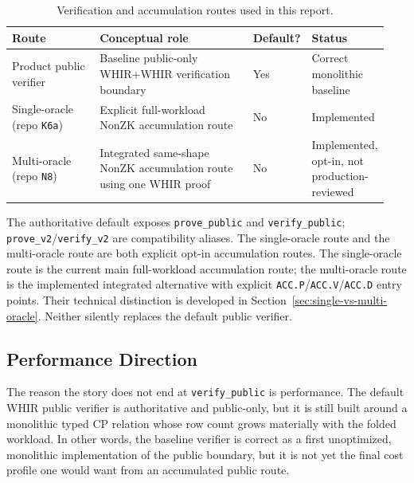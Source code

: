 \documentclass[11pt]{article}
\theoremstyle{definition}
\begin{document}
\begin{table}[H]
\centering
\small
\setlength{\tabcolsep}{3pt}
\renewcommand{\arraystretch}{1.15}
\begin{tabular}{>{\raggedright\arraybackslash}p{0.24\linewidth} >{\raggedright\arraybackslash}p{0.42\linewidth} >{\centering\arraybackslash}p{0.10\linewidth} >{\raggedright\arraybackslash}p{0.18\linewidth}}
\toprule
Route & Conceptual role & Default? & Status \\
\midrule
Product public verifier &
Baseline public-only WHIR+WHIR verification boundary &
Yes &
Correct monolithic baseline \\
Single-oracle (repo \texttt{K6a}) &
Explicit full-workload NonZK accumulation route &
No &
Implemented \\
Multi-oracle (repo \texttt{N8}) &
Integrated same-shape NonZK accumulation route using one WHIR proof &
No &
Implemented, opt-in, not production-reviewed \\
\bottomrule
\end{tabular}
\caption{Verification and accumulation routes used in this report.}
\label{tab:route-taxonomy}
\end{table}

The authoritative default exposes \texttt{prove\_public} and
\texttt{verify\_public}; \texttt{prove\_v2}\slash\texttt{verify\_v2} are
compatibility aliases. The
single-oracle route and the multi-oracle route are both explicit opt-in
accumulation routes. The single-oracle route is the current main full-workload
accumulation route; the multi-oracle route is the implemented integrated
alternative with explicit \texttt{ACC.P}\slash\texttt{ACC.V}\slash\texttt{ACC.D}
entry points. Their technical distinction is developed in Section~\ref{sec:single-vs-multi-oracle}.
Neither silently replaces the default public verifier.

\subsection{Performance Direction}
\label{sec:performance-direction}
The reason the story does not end at \texttt{verify\_public} is performance. The
default WHIR public verifier is authoritative and public-only, but it is still
built around a monolithic typed CP relation whose row count grows materially with
the folded workload. In other words, the baseline verifier is correct as a first
unoptimized, monolithic implementation of the public boundary, but it is not yet
the final cost profile one would want from an accumulated public route.
\end{document}
